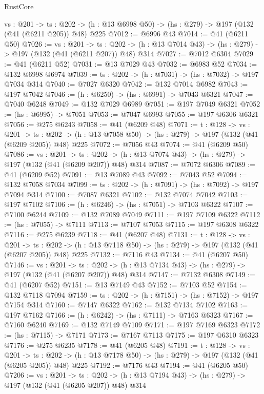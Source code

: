 \begin{lexlean}{RustCore}
\begin{coremodule}
  {vs : @201} ->
  {ts : @202} -> (h : @13 @6998 @50) -> (hs : @279) -> @197 (@132 (@41 (@6211 @205)) @48) @225
@7012 := @6996 @43
@7014 := @41 (@6211 @50)
@7026 := {vs : @201} ->
  {ts : @202} -> (h : @13 @7014 @43) -> (hs : @279) -> @197 (@132 (@41 (@6211 @207)) @48) @314
@7027 := @7012 @6304
@7029 := @41 (@6211 @52)
@7031 := @13 @7029 @43
@7032 := @6983 @52
@7034 := @132 @6998 @6974
@7039 := {ts : @202} -> (h : @7031) -> (hs : @7032) -> @197 @7034 @314
@7040 := @7027 @6320
@7042 := @132 @7014 @6982
@7043 := @197 @7042
@7046 := (h : @6250) -> (hs : @6991) -> @7043 @6321
@7047 := @7040 @6248
@7049 := @132 @7029 @6989
@7051 := @197 @7049 @6321
@7052 := (hs : @6995) -> @7051
@7053 := @7047 @6993
@7055 := @197 @6306 @6321
@7056 := @275 @6243
@7058 := @41 (@6209 @48)
@7071 := {t : @128} ->
  {vs : @201} ->
  {ts : @202} -> (h : @13 @7058 @50) -> (hs : @279) -> @197 (@132 (@41 (@6209 @205)) @48) @225
@7072 := @7056 @43
@7074 := @41 (@6209 @50)
@7086 := {vs : @201} ->
  {ts : @202} -> (h : @13 @7074 @43) -> (hs : @279) -> @197 (@132 (@41 (@6209 @207)) @48) @314
@7087 := @7072 @6306
@7089 := @41 (@6209 @52)
@7091 := @13 @7089 @43
@7092 := @7043 @52
@7094 := @132 @7058 @7034
@7099 := {ts : @202} -> (h : @7091) -> (hs : @7092) -> @197 @7094 @314
@7100 := @7087 @6321
@7102 := @132 @7074 @7042
@7103 := @197 @7102
@7106 := (h : @6246) -> (hs : @7051) -> @7103 @6322
@7107 := @7100 @6244
@7109 := @132 @7089 @7049
@7111 := @197 @7109 @6322
@7112 := (hs : @7055) -> @7111
@7113 := @7107 @7053
@7115 := @197 @6308 @6322
@7116 := @275 @6239
@7118 := @41 (@6207 @48)
@7131 := {t : @128} ->
  {vs : @201} ->
  {ts : @202} -> (h : @13 @7118 @50) -> (hs : @279) -> @197 (@132 (@41 (@6207 @205)) @48) @225
@7132 := @7116 @43
@7134 := @41 (@6207 @50)
@7146 := {vs : @201} ->
  {ts : @202} -> (h : @13 @7134 @43) -> (hs : @279) -> @197 (@132 (@41 (@6207 @207)) @48) @314
@7147 := @7132 @6308
@7149 := @41 (@6207 @52)
@7151 := @13 @7149 @43
@7152 := @7103 @52
@7154 := @132 @7118 @7094
@7159 := {ts : @202} -> (h : @7151) -> (hs : @7152) -> @197 @7154 @314
@7160 := @7147 @6322
@7162 := @132 @7134 @7102
@7163 := @197 @7162
@7166 := (h : @6242) -> (hs : @7111) -> @7163 @6323
@7167 := @7160 @6240
@7169 := @132 @7149 @7109
@7171 := @197 @7169 @6323
@7172 := (hs : @7115) -> @7171
@7173 := @7167 @7113
@7175 := @197 @6310 @6323
@7176 := @275 @6235
@7178 := @41 (@6205 @48)
@7191 := {t : @128} ->
  {vs : @201} ->
  {ts : @202} -> (h : @13 @7178 @50) -> (hs : @279) -> @197 (@132 (@41 (@6205 @205)) @48) @225
@7192 := @7176 @43
@7194 := @41 (@6205 @50)
@7206 := {vs : @201} ->
  {ts : @202} -> (h : @13 @7194 @43) -> (hs : @279) -> @197 (@132 (@41 (@6205 @207)) @48) @314

\end{coremodule}
\end{lexlean}
